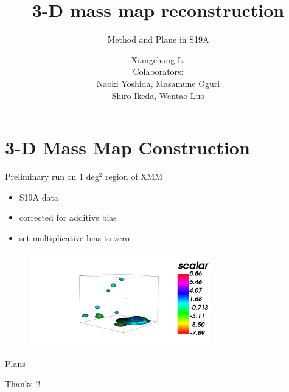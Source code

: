 \documentclass[9pt]{beamer}
\title{3-D mass map reconstruction}
\subtitle{Method and Plane in S19A}
\author{Xiangchong Li\\
Colaborators:\\
Naoki Yoshida, Masamune Oguri\\
Shiro Ikeda, Wentao Luo
}
\begin{document}
\titlepage


\section{3-D Mass Map Construction}



\begin{frame}{Preliminary run on $1$ deg$^2$ region of XMM}
\begin{itemize}
    \item S19A data
    \item corrected for additive bias
    \item set multiplicative bias to zero
\end{itemize}
\begin{figure}
\centering
\includegraphics[width=0.7\textwidth]{snapshot.png}
\end{figure}
\end{frame}

\begin{frame}{Plans}
    \begin{Huge}
        Thanks !!
    \end{Huge}
\end{frame}
\end{document}
